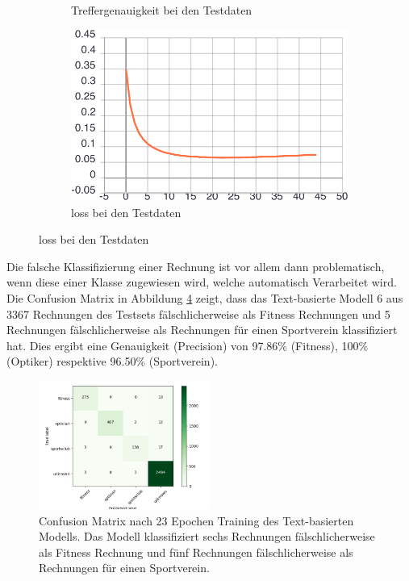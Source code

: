 \begin{figure}[ht]
\begin{subfigure}[b]{0.5\linewidth}
    \caption{Treffergenauigkeit bei den Testdaten} 
    \label{text-class-results:val_acc} 
  \end{subfigure}%
  \begin{subfigure}[b]{0.5\linewidth}
    \centering
    \includegraphics[width=0.75\linewidth]{graphics/text-classification/val_loss.pdf} 
    \caption{loss bei den Testdaten} 
    \label{text-class-results:val_loss} 
  \end{subfigure}
  \centering
\end{figure}

Die falsche Klassifizierung einer Rechnung ist vor allem dann problematisch, wenn diese einer Klasse zugewiesen wird, welche automatisch Verarbeitet wird. Die Confusion Matrix in Abbildung \ref{text-classification-cm} zeigt, dass das Text-basierte Modell 6 aus 3367 Rechnungen des Testsets fälschlicherweise als Fitness Rechnungen und 5 Rechnungen fälschlicherweise als Rechnungen für einen Sportverein klassifiziert hat. Dies ergibt eine Genauigkeit (Precision) von 97.86\% (Fitness), 100\% (Optiker) respektive 96.50\% (Sportverein).


\begin{figure} 
    \caption{Confusion Matrix nach 23 Epochen Training des Text-basierten Modells. Das Modell klassifiziert sechs Rechnungen fälschlicherweise als Fitness Rechnung und fünf Rechnungen fälschlicherweise als Rechnungen für einen Sportverein.}
    \label{text-classification-cm}
    \centering
    \includegraphics[width=0.5\textwidth]{graphics/text-classification/cm_22.png}
\end{figure}

